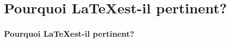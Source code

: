 
\section{Pourquoi \LaTeX\;est-il pertinent?}

\begin{frame}
    \frametitle{Pourquoi \LaTeX\;est-il pertinent?}
\end{frame}
